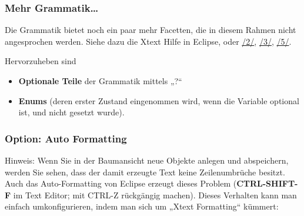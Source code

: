 \documentclass[a4]{article}
\providecommand{\tightlist}{%
  \setlength{\itemsep}{0pt}\setlength{\parskip}{0pt}}
\begin{document}
\subsubsection{Mehr Grammatik\ldots{}}\label{mehr-grammatik}

Die Grammatik bietet noch ein paar mehr Facetten, die in diesem Rahmen
nicht angesprochen werden. Siehe dazu die Xtext Hilfe in Eclipse, oder
\protect\hyperlink{anchor-2}{/2/}, \protect\hyperlink{anchor-3}{/3/},
\protect\hyperlink{anchor-5}{/5/}.

Hervorzuheben sind

\begin{itemize}
\tightlist
\item
  \textbf{Optionale Teile }der Grammatik mittels „?``
\item
  \textbf{Enums }(deren erster Zustand eingenommen wird, wenn die
  Variable optional ist, und nicht gesetzt wurde).
\end{itemize}

\subsubsection[Option: Auto
Formatting]{\texorpdfstring{\protect\hypertarget{anchor-27}{}{}Option:
Auto Formatting}{Option: Auto Formatting}}\label{option-auto-formatting}

Hinweis: Wenn Sie in der Baumansicht neue Objekte anlegen und
abspeichern, werden Sie sehen, dass der damit erzeugte Text keine
Zeilenumbrüche besitzt. Auch das Auto-Formatting von Eclipse erzeugt
dieses Problem (\textbf{CTRL-SHIFT-F} im Text Editor; mit CTRL-Z
rückgängig machen). Dieses Verhalten kann man einfach umkonfigurieren,
indem man sich um „Xtext Formatting`` kümmert:
\end{document}
